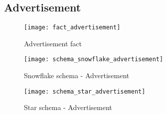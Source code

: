 \subsection*{Advertisement} 
\begin{figure}[!hbp]
  \texttt{[image: fact\_advertisement]}
\caption{\label{pic:f_adv}  Advertisement fact}
\end{figure}

\begin{figure}[!hbp]
    \texttt{[image: schema\_snowflake\_advertisement]}
\caption{\label{pic:sn_adv} Snowflake schema - Advertisement}
\end{figure}

\begin{figure}[!hbp]
    \texttt{[image: schema\_star\_advertisement]}
\caption{\label{pic:st_adv} Star schema - Advertisement}
\end{figure}

